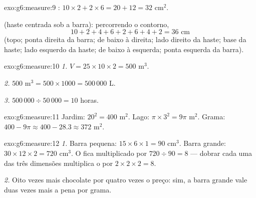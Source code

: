 \begin{solution}{exo:g6:measure:9}
: $10 \times 2 + 2 \times 6 = 20 + 12 = 32$ cm$^2$.

 (haste centrada sob a barra): percorrendo o contorno,
\[
10 + 2 + 4 + 6 + 2 + 6 + 4 + 2 = 36 \text{ cm}
\]
(topo; ponta direita da barra;  de baixo à direita; lado direito da
haste; base da haste; lado esquerdo da haste;  de baixo à esquerda;
ponta esquerda da barra).
\end{solution}

\begin{solution}{exo:g6:measure:10}
\emph{1.} $V = 25 \times 10 \times 2 = 500$ m$^3$.

\emph{2.} $500$ m$^3 = 500 \times 1000 = 500\,000$ L.

\emph{3.} $500\,000 \div 50\,000 = 10$ horas.
\end{solution}

\begin{solution}{exo:g6:measure:11}
Jardim: $20^2 = 400$ m$^2$. Lago: $\pi \times 3^2 = 9\pi$ m$^2$.
Grama: $400 - 9\pi \approx 400 - 28.3 \approx 372$ m$^2$.
\end{solution}

\begin{solution}{exo:g6:measure:12}
\emph{1.} Barra pequena: $15 \times 6 \times 1 = 90$ cm$^3$. Barra
grande: $30 \times 12 \times 2 = 720$ cm$^3$. O  fica
multiplicado por $720 \div 90 = 8$ --- dobrar cada uma das três
dimensões multiplica o  por $2 \times 2 \times 2 = 8$.

\emph{2.} Oito vezes mais chocolate por quatro vezes o preço: sim, a
barra grande vale duas vezes mais a pena por grama.
\end{solution}

